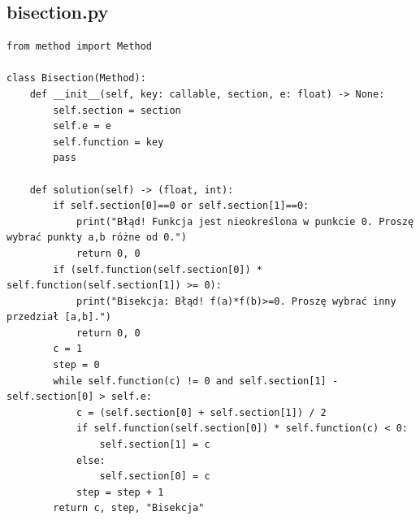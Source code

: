 \documentclass[12pt]{article}
\begin{document}
\subsection{bisection.py}
\begin{verbatim}
from method import Method

class Bisection(Method):
    def __init__(self, key: callable, section, e: float) -> None:
        self.section = section
        self.e = e
        self.function = key
        pass

    def solution(self) -> (float, int):
        if self.section[0]==0 or self.section[1]==0:
            print("Błąd! Funkcja jest nieokreślona w punkcie 0. Proszę wybrać punkty a,b różne od 0.")
            return 0, 0
        if (self.function(self.section[0]) * self.function(self.section[1]) >= 0):
            print("Bisekcja: Błąd! f(a)*f(b)>=0. Proszę wybrać inny przedział [a,b].")
            return 0, 0
        c = 1
        step = 0
        while self.function(c) != 0 and self.section[1] - self.section[0] > self.e:
            c = (self.section[0] + self.section[1]) / 2
            if self.function(self.section[0]) * self.function(c) < 0:
                self.section[1] = c
            else:
                self.section[0] = c
            step = step + 1
        return c, step, "Bisekcja"

\end{verbatim}
\end{document}
